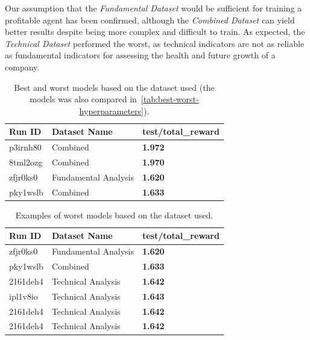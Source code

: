 \documentclass[../xlapes02]{subfiles}
\begin{document}
    Our assumption that the \emph{Fundamental Dataset} would be sufficient for training a profitable agent has been confirmed, although the \emph{Combined Dataset} can yield better results despite being more complex and difficult to train. As expected, the \emph{Technical Dataset} performed the worst, as technical indicators are not as reliable as fundamental indicators for assessing the health and future growth of a company.

    \begin{table}
        \centering
        \label{tab:best-worst-datasets}
        \begin{tabular}{|l|l|l|}
            \hline
            \textbf{Run ID} & \textbf{Dataset Name} & \textbf{test/total\_reward}                \\ \hline
            p3irnh80        & Combined              & \textcolor[RGB]{50,150,50}{\textbf{1.972}} \\ \hline
            8tml2ozg        & Combined              & \textcolor[RGB]{50,150,50}{\textbf{1.970}} \\ \hline
            zfjr0ks0        & Fundamental Analysis  & \textcolor[RGB]{150,50,50}{\textbf{1.620}} \\ \hline
            pky1wslb        & Combined              & \textcolor[RGB]{150,50,50}{\textbf{1.633}} \\ \hline
        \end{tabular}
        \caption{Best and worst models based on the dataset used (the models was also compared in~\cref{tab:best-worst-hyperparameters}).}
    \end{table}

    \begin{table}
        \centering
        \label{tab:worst-datasets}
        \begin{tabular}{|l|l|l|}
            \hline
            \textbf{Run ID} & \textbf{Dataset Name} & \textbf{test/total\_reward}                \\ \hline
            zfjr0ks0        & Fundamental Analysis  & \textcolor[RGB]{150,50,50}{\textbf{1.620}} \\ \hline
            pky1wslb        & Combined              & \textcolor[RGB]{150,50,50}{\textbf{1.633}} \\ \hline
            2161deh4        & Technical Analysis    & \textcolor[RGB]{150,50,50}{\textbf{1.642}} \\ \hline
            ipl1v8io        & Technical Analysis    & \textcolor[RGB]{150,50,50}{\textbf{1.643}} \\ \hline
            2161deh4        & Technical Analysis    & \textcolor[RGB]{150,50,50}{\textbf{1.642}} \\ \hline
            2161deh4        & Technical Analysis    & \textcolor[RGB]{150,50,50}{\textbf{1.642}} \\ \hline
        \end{tabular}
        \caption{Examples of worst models based on the dataset used.}
    \end{table}
\end{document}
